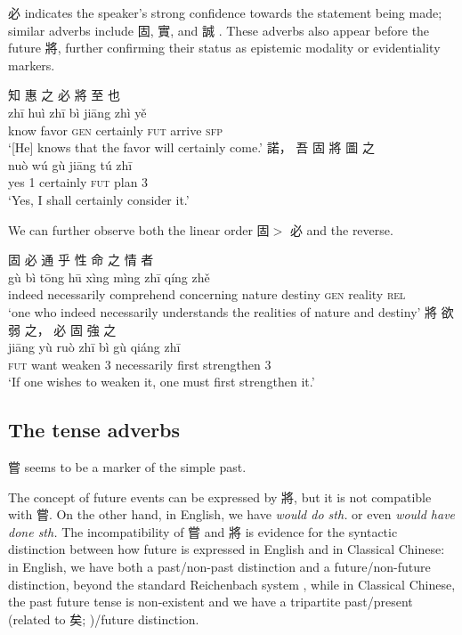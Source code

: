 \documentclass[UTF8, a4paper, oneside, scheme=plain, 12pt]{ctexrep}
\newcommand*{\textgt}{$>$ }
\newcommand*{\citepages}[1]{pp.~{#1}}
\newcommand{\form}[1]{\emph{#1}}
\newcommand{\translate}[1]{`#1'}
\newcommand*{\category}[1]{\textsc{#1}}
\begin{document}
必 indicates the speaker's strong confidence towards the statement being made;
similar adverbs include 固, 實, and 誠
\citep[\citepages{376-377}]{li2004grammar}.
These adverbs also appear before the future 將,
further confirming their status as epistemic modality or evidentiality markers.

\begin{exe}
    \ex
    \glll 知 惠 之 必 將 至 也 \\
    zhī huì zhī bì jiāng zhì yě \\
    know favor \category{gen} certainly \category{fut} arrive \category{sfp} \\
    \glt\translate{[He] knows that the favor will certainly come.}
    \ex
    \glll 諾， 吾 固 將 圖 之 \\
    nuò wú gù jiāng tú zhī \\
    yes 1 certainly \category{fut} plan 3 \\
    \glt\translate{Yes, I shall certainly consider it.}
\end{exe}

We can further observe both the linear order 固\textgt 必 and the reverse.

\begin{exe}
    \ex
    \glll 固 必 通 乎 性 命 之 情 者 \\
    gù bì tōng hū xìng mìng zhī qíng zhě \\
    indeed necessarily comprehend concerning nature destiny \category{gen} reality \category{rel} \\
    \glt\translate{one who indeed necessarily understands the realities of nature and destiny}
    \ex
    \glll 將 欲 弱 之， 必 固 強 之 \\
    jiāng yù ruò zhī bì gù qiáng zhī \\
    \category{fut} want weaken 3 necessarily first strengthen 3 \\
    \glt\translate{If one wishes to weaken it, one must first strengthen it.}
\end{exe}

\subsection{The tense adverbs}\label{sec:tam.adverbs.tense}

嘗 seems to be a marker of the simple past.

The concept of future events can be expressed by 將,
but it is not compatible with 嘗.
On the other hand, in English, we have \form{would do sth.} or even \form{would have done sth.}
The incompatibility of 嘗 and 將 is evidence for the syntactic distinction between how future is expressed in English and in Classical Chinese:
in English, we have both a past/non-past distinction and a future/non-future distinction, beyond the standard Reichenbach system \citep{vikner1985reichenbach},
while in Classical Chinese, the past future tense is non-existent and we have a tripartite past/present (related to 矣; )/future distinction.
\end{document}

